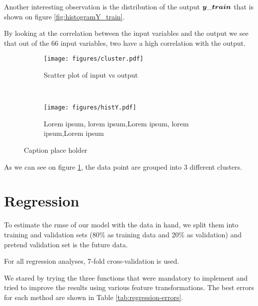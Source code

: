 \documentclass{article} %
\begin{document}
Another interesting observation is the distribution of the output $\boldmath{y\_train}$ that is shown on figure \ref{fig:histogramY_train}.

By looking at the correlation between the input variables and the output we see that out of the 66 input variables, two have a high correlation with the output.
\begin{figure*}[t!]
	\centering
	\begin{subfigure}[t]{0.5\textwidth}
		\centering
		\texttt{[image: figures/cluster.pdf]}
		\caption{Scatter plot of input vs output}\label{fig:scatterIO}
	\end{subfigure}%
	~ 
	\begin{subfigure}[t]{0.5\textwidth}
		\centering
		\texttt{[image: figures/histY.pdf]}
		\caption{Lorem ipsum, lorem ipsum,Lorem ipsum, lorem ipsum,Lorem ipsum}
	\end{subfigure}
	\caption{Caption place holder}
\end{figure*}

As we can see on figure \ref{fig:scatterIO}, the data point are grouped into 3 different clusters.



\section{Regression}
To  estimate the rmse of our model with the data in hand, we split them into training and validation sets (80\% as training data and 20\% as validation) and pretend validation set is the future data.

For all regression analyses, 7-fold cross-validation is used.

We stared by trying the three functions that were mandatory to implement and tried to improve the results using various feature transformations. The best errors for each method are shown in Table \ref{tab:regression-errors}.
\end{document}
